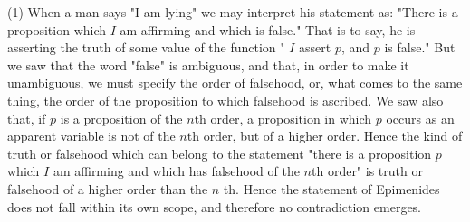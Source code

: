 \documentclass[10pt]{article}
\begin{document}
(1) When a man says "I am lying" we may interpret his statement as: "There is a proposition which $I$ am affirming and which is false." That is to say, he is asserting the truth of some value of the function " $I$ assert $p$, and $p$ is false." But we saw that the word "false" is ambiguous, and that, in order to make it unambiguous, we must specify the order of falsehood, or, what comes to the same thing, the order of the proposition to which falsehood is ascribed. We saw also that, if $p$ is a proposition of the $n$th order, a proposition in which $p$ occurs as an apparent variable is not of the $n$th order, but of a higher order. Hence the kind of truth or falsehood which can belong to the statement "there is a proposition $p$ which $I$ am affirming and which has falsehood of the $n$th order" is truth or falsehood of a higher order than the $n$ th. Hence the statement of Epimenides does not fall within its own scope, and therefore no contradiction emerges.
\end{document}
